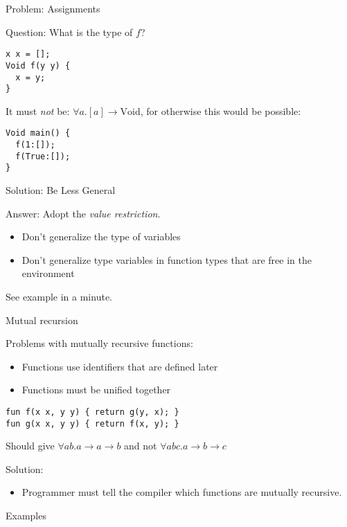 \documentclass{beamer}
\newcommand{\arr}{\rightarrow}
\begin{document}
\begin{frame}[fragile]{Problem: Assignments}

\onslide<+->

Question: What is the type of $f$?

\begin{verbatim}
x x = [];
Void f(y y) {
  x = y;
}
\end{verbatim}

\onslide<+->

It must \emph{not} be: $\forall a . [a] \arr \text{Void}$, for otherwise
this would be possible:

\begin{verbatim}
Void main() {
  f(1:[]);
  f(True:[]);
}
\end{verbatim}

\end{frame}


\begin{frame}{Solution: Be Less General}

Answer: Adopt the \emph{value restriction}.

\begin{itemize}
  \item Don't generalize the type of variables
  \item Don't generalize type variables in function types that are free
  in the environment
\end{itemize}

See example in a minute.

\end{frame}


\begin{frame}[fragile]{Mutual recursion}

\onslide<+->

Problems with mutually recursive functions:

\begin{itemize}
  \item Functions use identifiers that are defined later
  \item Functions must be unified together
\end{itemize}

\begin{verbatim}
fun f(x x, y y) { return g(y, x); }
fun g(x x, y y) { return f(x, y); }
\end{verbatim}

Should give $\forall ab . a \arr a \arr b$ and not $\forall abc . a
\arr b \arr c$

\onslide<+->

\vspace{1em}

Solution:

\begin{itemize}
  \item Programmer must tell the compiler which functions are mutually
  recursive.
\end{itemize}

\end{frame}


\begin{frame}{Examples}
\end{frame}
\end{document}
